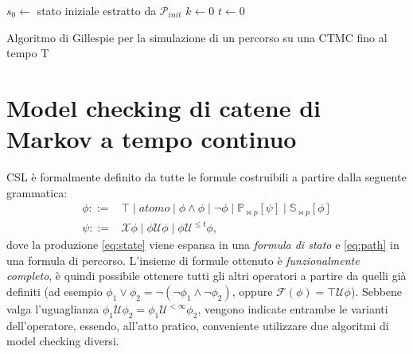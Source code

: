 	\begin{algorithm}[H]
			$s_0 \leftarrow$ stato iniziale estratto da $\mathcal{P}_{init}$\;
			$k \leftarrow 0$\;
			$t \leftarrow 0$\;
		\caption{Algoritmo di Gillespie per la simulazione di un percorso su una CTMC fino al tempo T}
		\label{alg:gillespie}
	\end{algorithm}
	
	\section{Model checking di catene di Markov a tempo continuo}\label{sez:modelcheck}
	CSL \`e formalmente definito da tutte le formule costruibili a partire dalla seguente grammatica:
	\begin{align}
		\phi ::=& \top \mid atomo \mid \phi \wedge \phi \mid \neg \phi \mid \mathbb{P}_{\bowtie p} [\psi] \mid \mathbb{S}_{\bowtie p} [\phi]\label{eq:state}\\
		\psi ::=& \mathcal{X} \phi \mid \phi \mathcal{U} \phi \mid \phi \mathcal{U}^{\leq t} \phi\label{eq:path},
	\end{align}
	dove la produzione \ref{eq:state} viene espansa in una \emph{formula di stato} e \ref{eq:path} in una formula di percorso.
	L'insieme di formule ottenuto \`e \emph{funzionalmente completo}, \`e quindi possibile ottenere tutti gli altri operatori a partire da quelli gi\`a definiti (ad esempio $\phi_1 \vee \phi_2 = \neg(\neg \phi_1 \wedge \neg \phi_2)$, oppure $\mathcal{F}(\phi) = \top \mathcal{U} \phi$).
	Sebbene valga l'uguaglianza $\phi_1 \mathcal{U} \phi_2 = \phi_1 \mathcal{U}^{< \infty} \phi_2$, vengono indicate entrambe le varianti dell'operatore, essendo, all'atto pratico, conveniente utilizzare due algoritmi di model checking diversi.
	
